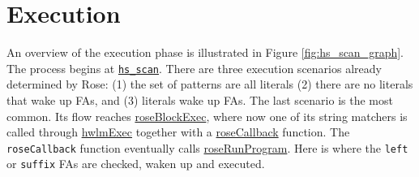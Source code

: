 \section{Execution}

An overview of the execution phase is illustrated in Figure \ref{fig:hs_scan_graph}. The process begins at \href{https://github.com/intel/hyperscan/blob/474d36044c50f0f8bdd51698cdec3329da79de9e/src/hs_runtime.h#L479}{\texttt{hs\_scan}}. There are three execution scenarios already determined by Rose: (1) the set of patterns are all literals (2) there are no literals that wake up FAs, and (3) literals wake up FAs. The last scenario is the most common. Its flow reaches \href{https://github.com/intel/hyperscan/blob/474d36044c50f0f8bdd51698cdec3329da79de9e/src/rose/rose.h#L41}{roseBlockExec}, where now one of its string matchers is called through \href{https://github.com/intel/hyperscan/blob/474d36044c50f0f8bdd51698cdec3329da79de9e/src/hwlm/hwlm.h#L116}{hwlmExec} together with a \href{https://github.com/intel/hyperscan/blob/474d36044c50f0f8bdd51698cdec3329da79de9e/src/rose/rose.h#L49}{roseCallback} function. The \texttt{roseCallback} function eventually calls \href{https://github.com/intel/hyperscan/blob/474d36044c50f0f8bdd51698cdec3329da79de9e/src/rose/program_runtime.h#L53}{roseRunProgram}. Here is where the \texttt{left} or \texttt{suffix} FAs are checked, waken up and executed.


